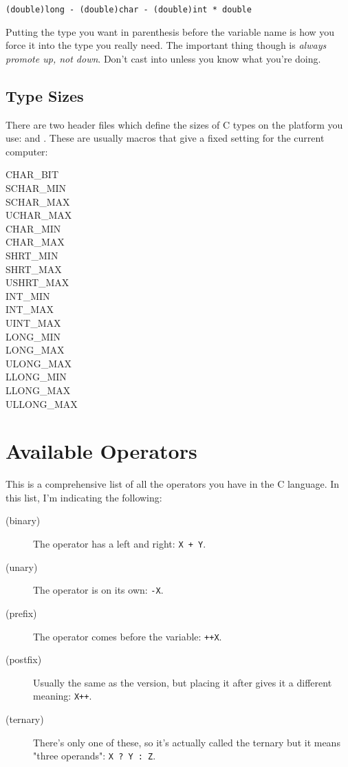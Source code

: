 \verb|(double)long - (double)char - (double)int * double|

Putting the type you want in parenthesis before the variable name is how you
force it into the type you really need.  The important thing though is 
\emph{always promote up, not down}.  Don't cast  into 
unless you know what you're doing.

\subsection{Type Sizes}

There are two header files which define the sizes of C types on the platform
you use:  and .  These are usually macros that
give a fixed setting for the current computer:

\begin{description}
\item[CHAR\_BIT]
\item[SCHAR\_MIN]
\item[SCHAR\_MAX]
\item[UCHAR\_MAX]
\item[CHAR\_MIN]
\item[CHAR\_MAX]
\item[SHRT\_MIN]
\item[SHRT\_MAX]
\item[USHRT\_MAX]
\item[INT\_MIN]
\item[INT\_MAX]
\item[UINT\_MAX]
\item[LONG\_MIN]
\item[LONG\_MAX]
\item[ULONG\_MAX]
\item[LLONG\_MIN]
\item[LLONG\_MAX]
\item[ULLONG\_MAX]
\end{description}

\section{Available Operators}

This is a comprehensive list of all the operators you have in the C language.
In this list, I'm indicating the following:

\begin{description}
\item[(binary)] The operator has a left and right: \verb|X + Y|.
\item[(unary)] The operator is on its own: \verb|-X|.
\item[(prefix)] The operator comes before the variable: \verb|++X|.
\item[(postfix)] Usually the same as the  version, but placing it
    after gives it a different meaning: \verb|X++|.
\item[(ternary)] There's only one of these, so it's actually called the
    ternary but it means "three operands": \verb|X ? Y : Z|.
\end{description}


